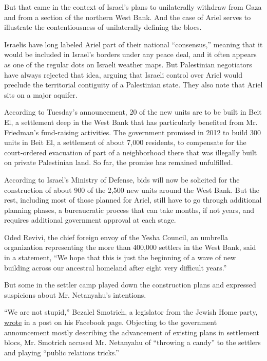 But that came in the context of Israel's plans to unilaterally withdraw
from Gaza and from a section of the northern West Bank. And the case of
Ariel serves to illustrate the contentiousness of unilaterally defining
the blocs.

Israelis have long labeled Ariel part of their national ``consensus,''
meaning that it would be included in Israel's borders under any peace
deal, and it often appears as one of the regular dots on Israeli weather
maps. But Palestinian negotiators have always rejected that idea,
arguing that Israeli control over Ariel would preclude the territorial
contiguity of a Palestinian state. They also note that Ariel sits on a
major aquifer.

According to Tuesday's announcement, 20 of the new units are to be built
in Beit El, a settlement deep in the West Bank that has particularly
benefited from Mr. Friedman's fund-raising activities. The government
promised in 2012 to build 300 units in Beit El, a settlement of about
7,000 residents, to compensate for the court-ordered evacuation of part
of a neighborhood there that was illegally built on private Palestinian
land. So far, the promise has remained unfulfilled.

According to Israel's Ministry of Defense, bids will now be solicited
for the construction of about 900 of the 2,500 new units around the West
Bank. But the rest, including most of those planned for Ariel, still
have to go through additional planning phases, a bureaucratic process
that can take months, if not years, and requires additional government
approval at each stage.

Oded Revivi, the chief foreign envoy of the Yesha Council, an umbrella
organization representing the more than 400,000 settlers in the West
Bank, said in a statement, ``We hope that this is just the beginning of
a wave of new building across our ancestral homeland after eight very
difficult years.''

But some in the settler camp played down the construction plans and
expressed suspicions about Mr. Netanyahu's intentions.

``We are not stupid,'' Bezalel Smotrich, a legislator from the Jewish
Home party,
\href{https://www.facebookcorewwwi.onion/Bezazelsmotrich/}{wrote} in a
post on his Facebook page. Objecting to the government announcement
mostly describing the advancement of existing plans in settlement blocs,
Mr. Smotrich accused Mr. Netanyahu of ``throwing a candy'' to the
settlers and playing ``public relations tricks.''

